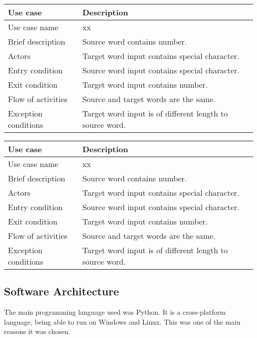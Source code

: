 \documentclass[12pt, a4]{report}
\begin{document}
	\begin{table}[ht]
	\begin{tabular}{|p{4cm}|p{12cm}|}
		\hline
		Use case & Description \\
		\hline
		Use case name & xx \\
		Brief description & Source word contains number. \\
		Actors & Target word input contains special character. \\
		Entry condition & Source word input contains special character. \\
		Exit condition & Target word input contains number. \\
		Flow of activities & Source and target words are the same.\\
		Exception conditions & Target word input is of different length to source word.\\
		\hline
	\end{tabular}
	\end{table}

	\begin{table}[ht]
	\begin{tabular}{|p{4cm}|p{12cm}|}
		\hline
		Use case & Description \\
		\hline
		Use case name & xx \\
		Brief description & Source word contains number. \\
		Actors & Target word input contains special character. \\
		Entry condition & Source word input contains special character. \\
		Exit condition & Target word input contains number. \\
		Flow of activities & Source and target words are the same.\\
		Exception conditions & Target word input is of different length to source word.\\
		\hline
	\end{tabular}
	\end{table}
	
	\pagebreak
	
	\subsection{Software Architecture}
	
	\par 
	
	The main programming language used was Python. It is a cross-platform language, being able to run on Windows and Linux. This was one of the main reasons it was chosen. 
\end{document}
